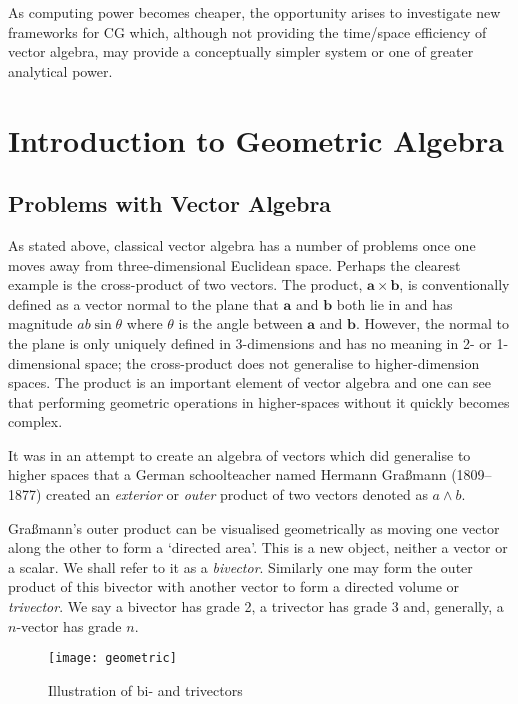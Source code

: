As computing power becomes cheaper, the opportunity
arises to investigate new
frameworks for CG which, although not providing the time/space
efficiency of vector algebra, may provide a conceptually simpler
system or one of greater analytical power.

\section{Introduction to Geometric Algebra}
\subsection{Problems with Vector Algebra}
As stated above, classical vector algebra has a number of problems
once one moves away from three-dimensional Euclidean space. Perhaps the
clearest example is the cross-product of two vectors.  The product, $\mathbf{a}
\times \mathbf{b}$, is conventionally defined as a vector normal to the plane
that $\mathbf{a}$ and $\mathbf{b}$ both lie in and has magnitude $ab\sin\theta$
where $\theta$ is the angle between $\mathbf{a}$ and $\mathbf{b}$. However, the
normal to the plane is only uniquely defined in 3-dimensions and has no meaning
in 2- or 1-dimensional space; the cross-product does not generalise to
higher-dimension spaces. The product is an important element of vector
algebra and one can see that performing geometric operations in higher-spaces
without it quickly becomes complex.

It was in an attempt \cite{grassmann} to create an algebra of vectors which 
did generalise
to higher spaces that a German schoolteacher named Hermann 
Gra{\ss}mann (1809--1877) created an \emph{exterior} 
or \emph{outer} product of two
vectors denoted as $a \wedge b$. 

Gra{\ss}mann's outer product can be visualised geometrically as moving
one vector along the other to form a `directed area'. This is a new object,
neither a vector or a scalar. We shall refer to it as a \emph{bivector}.
Similarly one may form the outer product of this bivector with another
vector to form a directed volume or \emph{trivector}. We say a 
bivector has grade 2, a trivector has grade 3 and, generally, a
$n$-vector has grade $n$.

\begin{figure}
\centering
\texttt{[image: geometric]}
\caption{Illustration of bi- and trivectors\label{fig:geometric}}
\end{figure}

